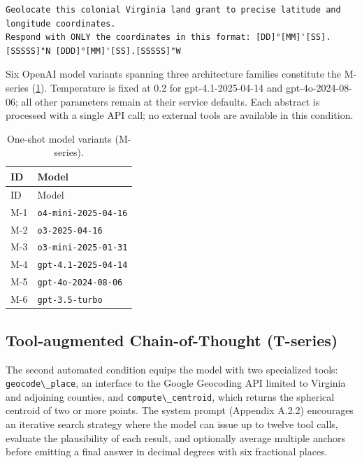 \begin{lstlisting}
Geolocate this colonial Virginia land grant to precise latitude and longitude coordinates.
Respond with ONLY the coordinates in this format: [DD]°[MM]'[SS].[SSSSS]"N [DDD]°[MM]'[SS].[SSSSS]"W
\end{lstlisting}

Six OpenAI model variants spanning three architecture families
constitute the M-series (\ref{tbl:mmodels}). Temperature is fixed at 0.2
for gpt-4.1-2025-04-14 and gpt-4o-2024-08-06; all other parameters
remain at their service defaults. Each abstract is processed with a
single API call; no external tools are available in this condition.

\begin{longtable}[]{@{}ll@{}}
\caption{\label{tbl:mmodels}One-shot model variants
(M-series).}\tabularnewline
\toprule\noalign{}
ID & Model \\
\midrule\noalign{}
\endfirsthead
\toprule\noalign{}
ID & Model \\
\midrule\noalign{}
\endhead
\bottomrule\noalign{}
\endlastfoot
M-1 & \passthrough{\lstinline!o4-mini-2025-04-16!} \\
M-2 & \passthrough{\lstinline!o3-2025-04-16!} \\
M-3 & \passthrough{\lstinline!o3-mini-2025-01-31!} \\
M-4 & \passthrough{\lstinline!gpt-4.1-2025-04-14!} \\
M-5 & \passthrough{\lstinline!gpt-4o-2024-08-06!} \\
M-6 & \passthrough{\lstinline!gpt-3.5-turbo!} \\
\end{longtable}

\subsection{Tool-augmented Chain-of-Thought
(T-series)}\label{tool-augmented-chain-of-thought-t-series}

The second automated condition equips the model with two specialized
tools: \passthrough{\lstinline!geocode\_place!}, an interface to the
Google Geocoding API limited to Virginia and adjoining counties, and
\passthrough{\lstinline!compute\_centroid!}, which returns the spherical
centroid of two or more points. The system prompt (Appendix A.2.2)
encourages an iterative search strategy where the model can issue up to
twelve tool calls, evaluate the plausibility of each result, and
optionally average multiple anchors before emitting a final answer in
decimal degrees with six fractional places.


